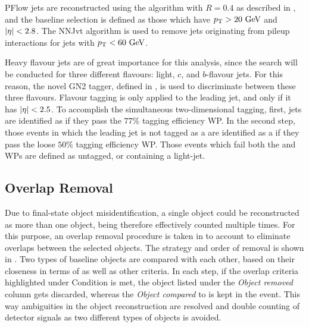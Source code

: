 \ac{PFlow} jets are reconstructed using the \antikt algorithm with \(R=0.4\) as described in \Sect{\ref{sec:objects:jets}}, and the baseline selection is defined as those which have \(p_{\text{T}}>20~\text{GeV}\) and \(|\eta|<2.8\). The \ac{NNJvt} algorithm is used to remove jets originating from pileup interactions for jets with \(p_{\text{T}}<60~\text{GeV}\).

Heavy flavour jets are of great importance for this analysis, since the search will be conducted for three different flavours: light, \(c\), and \(b\)-flavour jets. For this reason, the novel GN2 tagger, defined in \Sect{\ref{sec:objects:ftag}}, is used to discriminate between these three flavours.
Flavour tagging is only applied to the leading jet, and only if it has \(|\eta| < 2.5\).
To accomplish the simultaneous two-dimensional tagging, first, jets are identified as \bjets if they pass the \(77\%\) tagging efficiency \ac{WP}.
In the second step, those events in which the leading jet is not tagged as a \bjet are identified as a \cjet if they pass the loose \(50\%\) tagging efficiency \ac{WP}. Those events which fail both the \btag and \ctag \acp{WP} are defined as untagged, or containing a light-jet.


\subsection{Overlap Removal}
\label{subsec:evt_selection:presel:or}

Due to final-state object misidentification, a single object could be reconstructed as more than one object, being therefore effectively counted multiple times. For this purpose, an overlap removal procedure is taken in to account to eliminate overlaps between the selected objects. The strategy and order of removal is shown in \Tab{\ref{tab:evt_selection:presel:or}}. Two types of baseline objects are compared with each other, based on their closeness in terms of \DeltaR as well as other criteria. In each step, if the overlap criteria highlighted under Condition is met, the object listed under the \textit{Object removed} column gets discarded, whereas the \textit{Object compared} to is kept in the event. This way ambiguities in the object reconstruction are resolved and double counting of detector signals as two different types of objects is avoided.

